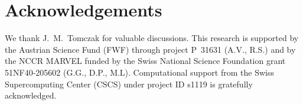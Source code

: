 \documentclass[aps,prx,twocolumn,superscriptaddress]{revtex4-2}
\begin{document}






\section*{Acknowledgements}
We thank J.~M.~Tomczak for valuable discussions. %
This research is supported by the Austrian Science Fund (FWF) through project P~31631 (A.V., R.S.) 
and by the NCCR MARVEL funded by the Swiss National Science Foundation grant 51NF40-205602 (G.G., D.P., M.L). 
Computational support from the Swiss Supercomputing Center (CSCS) under project ID s1119 is gratefully
acknowledged. 


%




\end{document}
